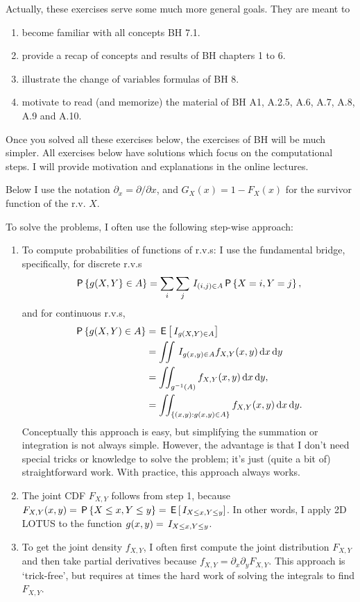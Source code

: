 \documentclass[a4paper,11pt]{article}
\begin{document}
Actually, these exercises serve some much more general goals. They are meant to
\begin{enumerate}
\item become familiar with all concepts  BH 7.1.
\item  provide a recap of concepts and results of  BH chapters 1 to 6.
\item illustrate the change of variables formulas of BH 8.
\item  motivate to read (and memorize) the material of BH A1, A.2.5, A.6, A.7, A.8, A.9 and A.10.
\end{enumerate}
Once you solved all these exercises below, the exercises of BH will be much simpler.
All exercises below have solutions which focus on the computational steps. I will provide motivation and  explanations in the online lectures.

Below I use the notation $\partial_x = \partial / \partial x$, and $G_{X}(x)=1-F_{X}(x)$ for the survivor function of the r.v. $X$.

To solve the problems, I often  use the following step-wise approach:
\begin{enumerate}
\item To compute probabilities of functions of r.v.s: I use the fundamental bridge, specifically, for discrete r.v.s
  \begin{equation}
    \label{eq:60}
\,\mathsf{P}\left\{g(X,Y\right\}\in A\} = \sum_{i}\sum_j \,I_{(i, j)\in A} \,\mathsf{P}\left\{X=i, Y=j\right\},
  \end{equation}
and for continuous r.v.s,
  \begin{equation}
    \label{eq:55}
    \begin{split}
\,\mathsf{P}\left\{g(X, Y) \in A\right\}
&= \,\mathsf{E}\left[\,I_{g(X,Y)\in A}\right] \\
&= \iint \,I_{g(x,y) \in A} f_{X,Y}(x,y) \,\textrm{d}x \,\textrm{d}y \\
&= \iint_{g^{-1}(A)} f_{X,Y}(x, y) \,\textrm{d}x \,\textrm{d}y,\\
&= \iint_{\{(x,y): g(x,y) \in A\}} f_{X,Y}(x,y) \,\textrm{d}x \,\textrm{d}y.
    \end{split}
  \end{equation}
Conceptually this approach is easy, but simplifying  the summation or integration is not always simple.
However, the advantage is that I don't need special tricks or knowledge to solve the problem; it's just (quite a bit of) straightforward work.
With practice, this approach always works.
\item The joint CDF $F_{X,Y}$ follows from step 1, because $F_{X,Y}(x,y) = \,\mathsf{P}\left\{X\leq x, Y\leq y\right\} = \,\mathsf{E}\left[\,I_{X\leq x, Y\leq y}\right]$.
  In other words, I apply 2D LOTUS to the function $g(x,y) = \,I_{X\leq x, Y\leq y}$.
\item To get the joint density $f_{X,Y}$, I often first compute the joint distribution $F_{X,Y}$ and then take partial derivatives because $f_{X,Y} = \partial_{x}\partial_y F_{X,Y}$.
  This approach is `trick-free', but requires at times the hard work of solving the integrals to find $F_{X,Y}$.
\end{enumerate}
\end{document}
